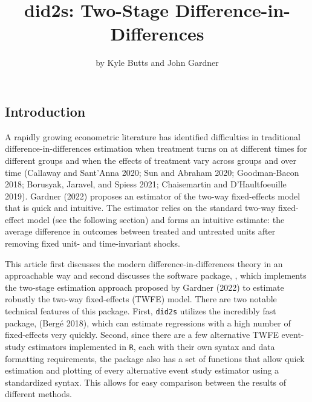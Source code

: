 \title{did2s: Two-Stage Difference-in-Differences}
\author{by Kyle Butts and John Gardner}

\maketitle


\hypertarget{introduction}{%
\subsection{Introduction}\label{introduction}}

A rapidly growing econometric literature has identified difficulties in traditional difference-in-differences estimation when treatment turns on at different times for different groups and when the effects of treatment vary across groups and over time (Callaway and Sant'Anna 2020; Sun and Abraham 2020; Goodman-Bacon 2018; Borusyak, Jaravel, and Spiess 2021; Chaisemartin and D'Haultfoeuille 2019). Gardner (2022) proposes an estimator of the two-way fixed-effects model that is quick and intuitive. The estimator relies on the standard two-way fixed-effect model (see the following section) and forms an intuitive estimate: the average difference in outcomes between treated and untreated units after removing fixed unit- and time-invariant shocks.

This article first discusses the modern difference-in-differences theory in an approachable way and second discusses the software package, , which implements the two-stage estimation approach proposed by Gardner (2022) to estimate robustly the two-way fixed-effects (TWFE) model. There are two notable technical features of this package. First, \texttt{did2s} utilizes the incredibly fast package,  (Bergé 2018), which can estimate regressions with a high number of fixed-effects very quickly. Second, since there are a few alternative TWFE event-study estimators implemented in \texttt{R}, each with their own syntax and data formatting requirements, the package also has a set of functions that allow quick estimation and plotting of every alternative event study estimator using a standardized syntax. This allows for easy comparison between the results of different methods.

